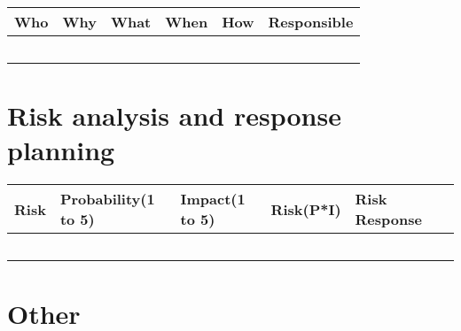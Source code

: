 \documentclass[10pt]{projectdoc}
\begin{document}
\begin{table}[H]
\begin{tabularx}{\columnwidth}{|X|X|X|X|X|X|}
    \hline
    Who & Why & What & When & How & Responsible                   \\ \hline
    &     &      &      &     &                                   \\ \hline 
    &     &      &      &     &                                   \\ \hline 
    &     &      &      &     &                                   \\ \hline 
    &     &      &      &     &                                   \\ \hline 
    &     &      &      &     &                                   \\ \hline
\end{tabularx}
\end{table}

\section{Risk analysis and response planning}
\begin{table}[H]
\begin{tabularx}{\columnwidth}{|X|X|X|X|X|X|}
\hline
Risk & Probability(1 to 5) & Impact(1 to 5) & Risk(P*I) & Risk Response \\ \hline
     &                     &                &           &               \\ \hline
     &                     &                &           &               \\ \hline
     &                     &                &           &               \\ \hline
     &                     &                &           &               \\ \hline
     &                     &                &           &               \\ \hline
\end{tabularx}
\end{table}

\section{Other}

\end{document}
